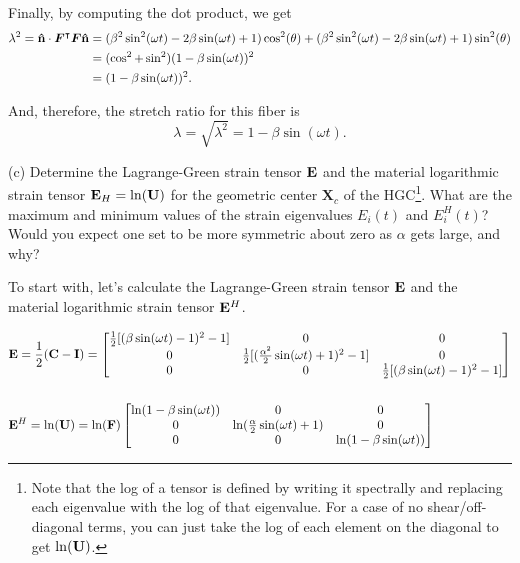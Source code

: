 Finally, by computing the dot product, we get
\begin{align*}
    \lambda^2 = \mathbf{\hat{n}} \cdot \bm{F}^\intercal \bm{F} \mathbf{\hat{n}} &= (\beta^2 \sin^2 (\omega t) - 2 \beta \sin (\omega t) + 1) \cos^2 (\theta) + (\beta^2 \sin^2 (\omega t) - 2 \beta \sin (\omega t) + 1) \sin^2 (\theta)\\
    &= (\cos^2 + \sin^2)(1 - \beta \sin(\omega t))^2\\
    &= (1 - \beta \sin(\omega t))^2.
\end{align*}

And, therefore, the stretch ratio for this fiber is
\begin{equation*}
    \lambda = \sqrt{\lambda^2} = 1 - \beta \sin(\omega t).
\end{equation*}

\medskip
(c) Determine the Lagrange-Green strain tensor $\mathbf{E}$ and the material logarithmic strain tensor $\mathbf{E}_H = \ln (\mathbf{U})$ for the geometric center $\bm{X}_c$ of the HGC\footnote{Note that the log of a tensor is defined by writing it spectrally and replacing each eigenvalue with the log of that eigenvalue. For a case of no shear/off-diagonal terms, you can just take the log of each element on the diagonal to get $\ln(\mathbf{U})$.}. 
What are the maximum and minimum values of the strain eigenvalues $E_i(t)$ and $E_i^H(t)$? 
Would you expect one set to be more symmetric about zero as $\alpha$ gets large, and why?

To start with, let's calculate the Lagrange-Green strain tensor $\mathbf{E}$ and the material logarithmic strain tensor $\mathbf{E}^H$.

\begin{align*}
&\mathbf{E} = \frac{1}{2} (\mathbf{C} - \mathbf{I}) =
\begin{bmatrix}
\frac{1}{2}[(\beta\sin(\omega t) - 1)^2 - 1] & 0 & 0\\
0 & \frac{1}{2}[(\frac{\alpha^2}{2} \sin (\omega t) + 1)^2 -1] & 0\\
0 & 0 & \frac{1}{2}[(\beta\sin(\omega t) - 1)^2 - 1]
\end{bmatrix}\\
\\
&\mathbf{E}^H = \ln(\mathbf{U}) = \ln(\mathbf{F})
\begin{bmatrix}
\ln (1- \beta \sin (\omega t)) & 0 & 0\\
0 & \ln (\frac{\alpha}{2} \sin (\omega t) +1) & 0\\
0 & 0 & \ln(1- \beta \sin (\omega t))
\end{bmatrix}
\end{align*}

